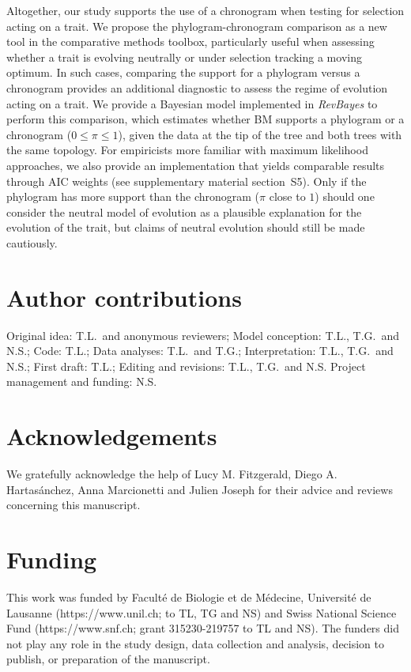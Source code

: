 \documentclass{article}
\newcommand{\PhyloSupport}{\pi}
\begin{document}
Altogether, our study supports the use of a chronogram when testing for selection acting on a trait.
We propose the phylogram-chronogram comparison as a new tool in the comparative methods toolbox, particularly useful when assessing whether a trait is evolving neutrally or under selection tracking a moving optimum.
In such cases, comparing the support for a phylogram versus a chronogram provides an additional diagnostic to assess the regime of evolution acting on a trait.
We provide a Bayesian model implemented in \textit{RevBayes} to perform this comparison, which estimates whether BM supports a phylogram or a chronogram ($0 \leq \PhyloSupport \leq 1$), given the data at the tip of the tree and both trees with the same topology.
For empiricists more familiar with maximum likelihood approaches, we also provide an implementation that yields comparable results through AIC weights (see supplementary material section~S5).
Only if the phylogram has more support than the chronogram ($\PhyloSupport$ close to $1$) should one consider the neutral model of evolution as a plausible explanation for the evolution of the trait, but claims of neutral evolution should still be made cautiously.


\section*{Author contributions}
Original idea: T.L.\ and anonymous reviewers;
Model conception: T.L., T.G.\ and N.S.;
Code: T.L.;
Data analyses: T.L.\ and T.G.;
Interpretation: T.L., T.G.\ and N.S.;
First draft: T.L.;
Editing and revisions: T.L., T.G.\ and N.S.
Project management and funding: N.S\@.

\section*{Acknowledgements}
\label{sec:acknowledgment}
We gratefully acknowledge the help of Lucy M. Fitzgerald, Diego A. Hartasánchez, Anna Marcionetti and Julien Joseph for their advice and reviews concerning this manuscript.

\section*{Funding}
This work was funded by Faculté de Biologie et de Médecine, Université de Lausanne (https://www.unil.ch; to TL, TG and NS) and Swiss National Science Fund (https://www.snf.ch; grant 315230-219757 to TL and NS). The funders did not play any role in the study design, data collection and analysis, decision to publish, or preparation of the manuscript.
\end{document}
